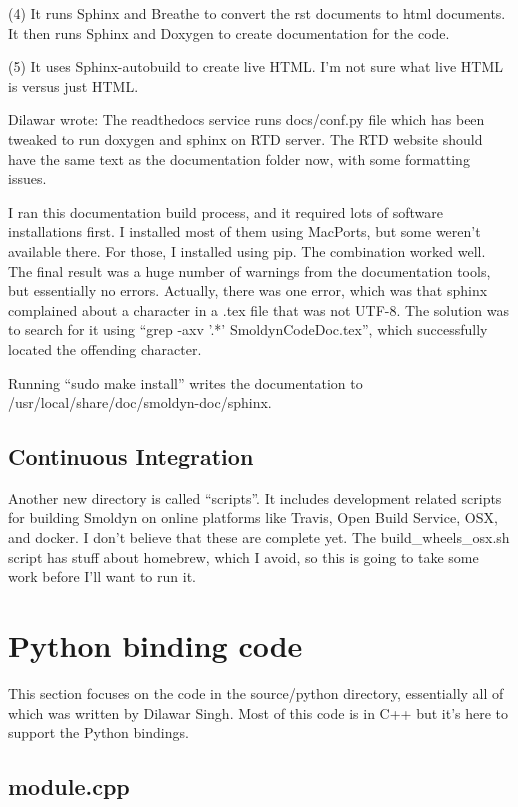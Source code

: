 \documentclass {scrbook}
\begin{document}
(4) It runs Sphinx and Breathe to convert the rst documents to html documents. It then runs Sphinx and Doxygen to create documentation for the code.

(5) It uses Sphinx-autobuild to create live HTML. I'm not sure what live HTML is versus just HTML.

Dilawar wrote: The readthedocs service runs docs/conf.py file which has been tweaked to run doxygen and sphinx on RTD server. The RTD website should have the same text as the documentation folder now, with some formatting issues.

I ran this documentation build process, and it required lots of software installations first. I installed most of them using MacPorts, but some weren't available there. For those, I installed using pip. The combination worked well. The final result was a huge number of warnings from the documentation tools, but essentially no errors. Actually, there was one error, which was that sphinx complained about a character in a .tex file that was not UTF-8. The solution was to search for it using ``grep -axv '.*' SmoldynCodeDoc.tex'', which successfully located the offending character.

Running ``sudo make install'' writes the documentation to /usr/local/share/doc/smoldyn-doc/sphinx.


\section{Continuous Integration}

Another new directory is called ``scripts''. It includes development related scripts for building Smoldyn on online platforms like Travis, Open Build Service, OSX, and docker. I don't believe that these are complete yet. The build\_wheels\_osx.sh script has stuff about homebrew, which I avoid, so this is going to take some work before I'll want to run it.


\chapter{Python binding code}

This section focuses on the code in the source/python directory, essentially all of which was written by Dilawar Singh. Most of this code is in C++ but it's here to support the Python bindings.

\section{module.cpp}
\end{document}
